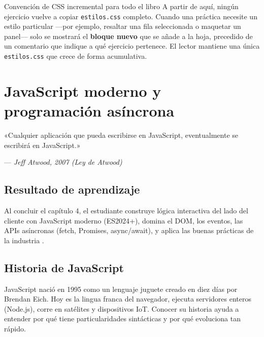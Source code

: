\begin{cajabuenas}{Convención de CSS incremental para todo el libro}
A partir de aquí, ningún ejercicio vuelve a copiar \texttt{estilos.css}
completo. Cuando una práctica necesite un estilo particular ---por ejemplo,
resaltar una fila seleccionada o maquetar un panel--- solo se mostrará el
\textbf{bloque nuevo} que se añade a la hoja, precedido de un comentario que
indique a qué ejercicio pertenece. El lector mantiene una única
\texttt{estilos.css} que crece de forma acumulativa.
\end{cajabuenas}


\chapter{JavaScript moderno y programación asíncrona}
\label{cap:semana4}

\epigraph{«Cualquier aplicación que pueda escribirse en JavaScript,
eventualmente se escribirá en JavaScript.»}{--- \textit{Jeff
Atwood, 2007 (Ley de Atwood)}}

\section*{Resultado de aprendizaje}
Al concluir el capítulo 4, el estudiante construye lógica interactiva
del lado del cliente con JavaScript moderno (ES2024+), domina el DOM,
los eventos, las APIs asíncronas (fetch, Promises, async/await), y
aplica las buenas prácticas de la industria
\cite{flanagan2020javascript,crockford2008javascript}.

\section{Historia de JavaScript}

JavaScript nació en 1995 como un lenguaje juguete creado en
diez días por Brendan Eich. Hoy es la lingua franca del navegador,
ejecuta servidores enteros (Node.js), corre en satélites y dispositivos
IoT. Conocer su historia ayuda a entender por qué tiene
particularidades sintácticas y por qué evoluciona tan rápido.


